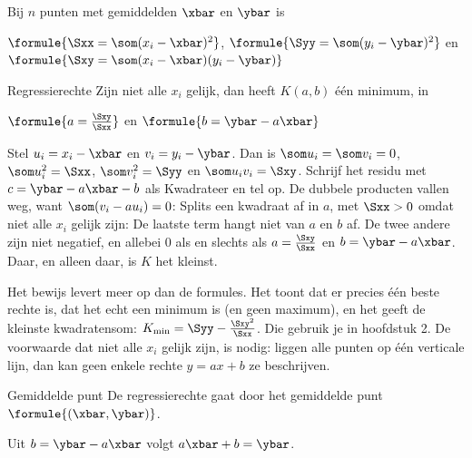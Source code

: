 \begin{theorie}
Bij $n$ punten met gemiddelden $\xbar$ en $\ybar$ is

\vspace{1mm}
\qquad $\formule{\Sxx = \som (x_i - \xbar)^2}$, \quad $\formule{\Syy = \som (y_i - \ybar)^2}$ \quad en \quad $\formule{\Sxy = \som (x_i - \xbar)(y_i - \ybar)}$

\begin{stelling}{Regressierechte}
Zijn niet alle $x_i$ gelijk, dan heeft $K(a, b)$ één minimum, in

\vspace{1mm}
\qquad $\formule{a = \frac{\Sxy}{\Sxx}}$ \quad en \quad $\formule{b = \ybar - a\xbar}$
\end{stelling}

\begin{bewijs}
Stel $u_i = x_i - \xbar$ en $v_i = y_i - \ybar$. Dan is $\som u_i = \som v_i = 0$, $\som u_i^2 = \Sxx$, $\som v_i^2 = \Syy$ en $\som u_i v_i = \Sxy$. Schrijf het residu met $c = \ybar - a\xbar - b$ als
Kwadrateer en tel op. De dubbele producten vallen weg, want $\som (v_i - a u_i) = 0$:
Splits een kwadraat af in $a$, met $\Sxx > 0$ omdat niet alle $x_i$ gelijk zijn:
De laatste term hangt niet van $a$ en $b$ af. De twee andere zijn niet negatief, en allebei 0 als en slechts als $a = \frac{\Sxy}{\Sxx}$ en $b = \ybar - a\xbar$. Daar, en alleen daar, is $K$ het kleinst.
\end{bewijs}
\end{theorie}

Het bewijs levert meer op dan de formules. Het toont dat er precies één beste rechte is, dat het echt een minimum is (en geen maximum), en het geeft de kleinste kwadratensom: $K_{\min} = \Syy - \frac{\Sxy^2}{\Sxx}$. Die gebruik je in hoofdstuk 2. De voorwaarde dat niet alle $x_i$ gelijk zijn, is nodig: liggen alle punten op één verticale lijn, dan kan geen enkele rechte $y = ax + b$ ze beschrijven.

\begin{theorie}
\begin{stelling}{Gemiddelde punt}
De regressierechte gaat door het gemiddelde punt $\formule{(\xbar, \ybar)}$.
\end{stelling}

\begin{bewijs}
Uit $b = \ybar - a\xbar$ volgt $a\xbar + b = \ybar$.
\end{bewijs}
\end{theorie}

